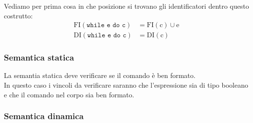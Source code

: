 \smallskip
Vediamo per prima cosa in che posizione si trovano gli identificatori dentro questo costrutto:
\[
    \begin{aligned}
        \mathrm{FI(\texttt{while e do c})} &= \mathrm{FI(c)} \cup \mathrm{e}\\
        \mathrm{DI(\texttt{while e do c})} &= \mathrm{DI(c)}
    \end{aligned}
\]

\subsubsection{Semantica statica}
La semantia statica deve verificare se il comando è ben formato.\\[0.2ex]
In questo caso i vincoli da verificare saranno che l'espressione sia di tipo booleano e che il comando nel corpo sia ben formato.


\subsubsection{Semantica dinamica}


